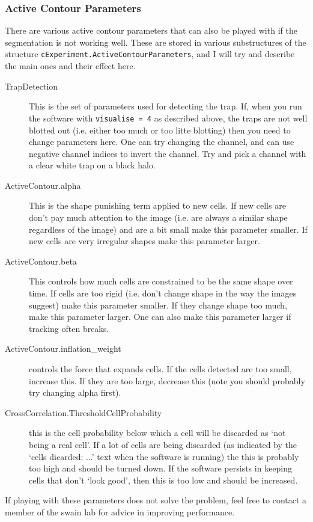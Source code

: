 \subsubsection{Active Contour Parameters}
There are various active contour parameters that can also be played with if the segmentation is not working well. These are stored in various substructures of the structure \texttt{cExperiment.ActiveContourParameters}, and I will try and describe the main ones and their effect here.
\begin{description}
	\item[TrapDetection] This is the set of parameters used for detecting the trap. If, when you run the software with \texttt{visualise = 4} as described above, the traps are not well blotted out (i.e. either too much or too litte blotting) then you need to change parameters here. One can try changing the channel, and can use negative channel indices to invert the channel. Try and pick a channel with a clear white trap on a black halo.
	\item[ActiveContour.alpha] This is the shape punishing term applied to new cells. If new cells are don't pay much attention to the image (i.e. are always a similar shape regardless of the image) and are a bit small make this parameter smaller. If new cells are very irregular shapes make this parameter larger.
	\item[ActiveContour.beta] This controls how much cells are constrained to be the same shape over time. If cells are too rigid (i.e. don't change shape in the way the images suggest) make this parameter smaller. If they change shape too much, make this parameter larger. One can also make this parameter larger if tracking often breaks.
	\item[ActiveContour.inflation\_weight] controls the force that expands cells. If the cells detected are too small, increase this. If they are too large, decrease this (note you should probably try changing alpha first).
	\item[CrossCorrelation.ThresholdCellProbability] this is the cell probability below which a cell will be discarded as `not being a real cell'. If a lot of cells are being discarded (as indicated by the `cells dicarded: ...' text when the software is running) the this is probably too high and should be turned down. If the software persists in keeping cells that don't `look good', then this is too low and should be increased.
\end{description}

If playing with these parameters does not solve the problem, feel free to contact a member of the swain lab for advice in improving performance.

